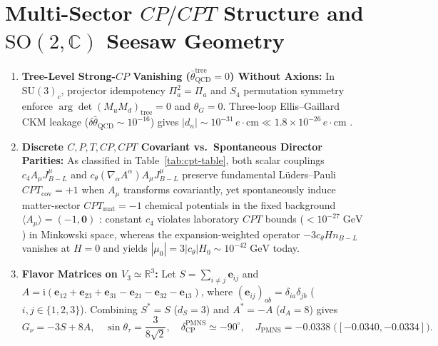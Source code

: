 \documentclass[11pt,a4paper]{article}
\begin{document}
\section{Multi-Sector \texorpdfstring{$CP/CPT$}{CP/CPT} Structure and \texorpdfstring{$\mathrm{SO}(2,\mathbb{C})$}{SO(2,C)} Seesaw Geometry}
\label{sec:cp-architecture}

\begin{enumerate}[label=(\arabic*),leftmargin=1.8em,itemsep=3pt]
\item \textbf{Tree-Level Strong-$CP$ Vanishing ($\bar{\theta}_{\mathrm{QCD}}^{\mathrm{tree}} = 0$) Without Axions:} In $\mathrm{SU}(3)_c$, projector idempotency $\Pi_a^2 = \Pi_a$ and $S_4$ permutation symmetry enforce $\arg\det(M_u M_d)_{\mathrm{tree}} = 0$ and $\theta_G = 0$. Three-loop Ellis--Gaillard CKM leakage \cite{EllisGaillard1979} ($\delta\bar{\theta}_{\mathrm{QCD}} \sim 10^{-16}$) gives $|d_n| \sim 10^{-31}\,e\cdot\mathrm{cm} \ll 1.8\times 10^{-26}\,e\cdot\mathrm{cm}$ \cite{Abel2020nEDM}.
\item \textbf{Discrete $C, P, T, CP, CPT$ Covariant vs.\ Spontaneous Director Parities:} As classified in Table~\ref{tab:cpt-table}, both scalar couplings $c_4 A_\mu J_{B-L}^\mu$ and $c_\theta(\nabla_\alpha A^\alpha)A_\mu J_{B-L}^\mu$ preserve fundamental L\"uders--Pauli $CPT_{\mathrm{cov}} = +1$ when $A_\mu$ transforms covariantly, yet spontaneously induce matter-sector $CPT_{\mathrm{mat}} = -1$ chemical potentials in the fixed background $\langle A_\mu\rangle = (-1,\mathbf{0})$ \cite{CohenKaplan1987}: constant $c_4$ violates laboratory $CPT$ bounds ($< 10^{-27}\;\mathrm{GeV}$) in Minkowski space, whereas the expansion-weighted operator $-3c_\theta H n_{B-L}$ vanishes at $H = 0$ and yields $|\mu_0| = 3|c_\theta|H_0 \sim 10^{-42}\;\mathrm{GeV}$ today.
\item \textbf{Flavor Matrices on $V_3 \simeq \mathbb{R}^3$:} Let $S = \sum_{i\neq j}\mathbf{e}_{ij}$ and $A = \mathrm{i}(\mathbf{e}_{12} + \mathbf{e}_{23} + \mathbf{e}_{31} - \mathbf{e}_{21} - \mathbf{e}_{32} - \mathbf{e}_{13})$, where $(\mathbf{e}_{ij})_{ab} = \delta_{ia}\delta_{jb}$ ($i,j \in \{1,2,3\}$). Combining $S^* = S$ ($d_S = 3$) and $A^* = -A$ ($d_A = 8$) gives
\begin{equation}
G_\nu = -3S + 8A, \quad \sin\theta_\tau = \frac{3}{8\sqrt{2}}, \quad \delta_{\mathrm{CP}}^{\mathrm{PMNS}} \simeq -90^\circ, \quad J_{\mathrm{PMNS}} = -0.0338\;\bigl([-0.0340, -0.0334]\bigr).
\label{eq:gnu}
\end{equation}
\end{enumerate}
\end{document}
